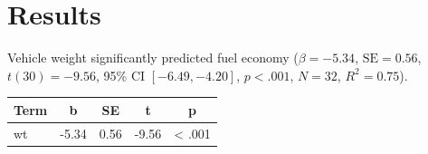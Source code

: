 \documentclass{article}
\begin{document}
\section{Results}

Vehicle weight significantly predicted fuel economy
($\beta = -5.34$, $\mathrm{SE} = 0.56$, $t(30) = -9.56$, 95\% CI $[-6.49, -4.20]$, $p < .001$, $N = 32$, $R^2 = 0.75$).

\begin{tabular}{lcccc}
Term & b & SE & t & p \\
\hline
wt & -5.34 & 0.56 & -9.56 & < .001 \\
\end{tabular}
\end{document}
